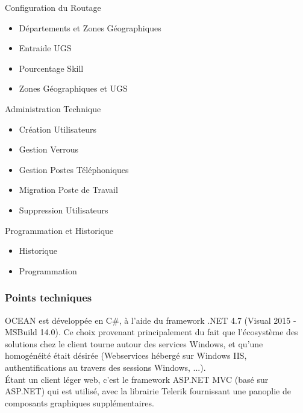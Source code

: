 \documentclass{rapport}
\begin{document}
\begin{itemize}
\begin{minipage}{0.5\textwidth}
    \item Configuration du Routage
        \begin{itemize}
        \item Départements et Zones Géographiques
        \item Entraide UGS
        \item Pourcentage Skill
        \item Zones Géographiques et UGS
        \end{itemize}
    \vspace{5mm} %
    \item Administration Technique
        \begin{itemize}
        \item Création Utilisateurs
        \item Gestion Verrous
        \item Gestion Postes Téléphoniques
        \item Migration Poste de Travail
        \item Suppression Utilisateurs
        \end{itemize}
    \vspace{5mm} %
    \item Programmation et Historique
        \begin{itemize}
        \item Historique
        \item Programmation
        \end{itemize}
\end{minipage}
\end{itemize}


\subsubsection{Points techniques}

OCEAN est développée en C\#, à l'aide du framework .NET 4.7 (Visual 2015 - MSBuild 14.0). Ce choix provenant principalement du fait que l'écosystème des solutions chez le client tourne autour des services Windows, et qu'une homogénéité était désirée (Webservices hébergé sur Windows IIS, authentifications au travers des sessions Windows, ...).\\
Étant un client léger web, c'est le framework ASP.NET MVC (basé sur ASP.NET) qui est utilisé, avec la librairie Telerik fournissant une panoplie de composants graphiques supplémentaires.\\
\end{document}
